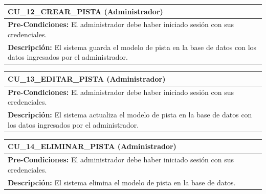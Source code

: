 \begin{center}
  \begin{tabular}{| p{7.5cm} | p{7.5cm} |}
    \hline
    \multicolumn{2}{|p{15cm}|}{\textbf{CU\_12\_CREAR\_PISTA} (Administrador)} \\ \hline
    \multicolumn{2}{|p{15cm}|}{\textbf{Pre-Condiciones:} El administrador debe haber iniciado sesión con sus credenciales.} \\ \hline
    \multicolumn{2}{|p{15cm}|}{\textbf{Descripción:} El sistema guarda el modelo de pista en la base de datos con los datos ingresados por el administrador. } \\
    \hline
  \end{tabular}
  
  \label{table:usecase:12}
\end{center}

\begin{center}
  \begin{tabular}{| p{7.5cm} | p{7.5cm} |}
    \hline
    \multicolumn{2}{|p{15cm}|}{\textbf{CU\_13\_EDITAR\_PISTA} (Administrador)} \\ \hline
    \multicolumn{2}{|p{15cm}|}{\textbf{Pre-Condiciones:} El administrador debe haber iniciado sesión con sus credenciales.} \\ \hline
    \multicolumn{2}{|p{15cm}|}{\textbf{Descripción:} El sistema actualiza el modelo de pista en la base de datos con los datos ingresados por el administrador.} \\
    \hline
  \end{tabular}
  
  \label{table:usecase:13}
\end{center}

\begin{center}
  \begin{tabular}{| p{7.5cm} | p{7.5cm} |}
    \hline
    \multicolumn{2}{|p{15cm}|}{\textbf{CU\_14\_ELIMINAR\_PISTA} (Administrador)} \\ \hline
    \multicolumn{2}{|p{15cm}|}{\textbf{Pre-Condiciones:} El administrador debe haber iniciado sesión con sus credenciales.} \\ \hline
    \multicolumn{2}{|p{15cm}|}{\textbf{Descripción:} El sistema elimina el modelo de pista en la base de datos.} \\
    \hline
  \end{tabular}
  
  \label{table:usecase:14}
\end{center}

